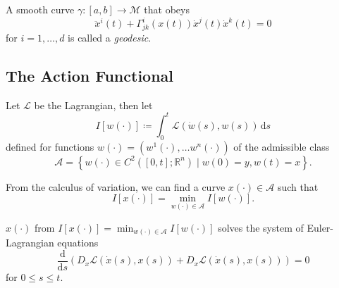 \begin{definition}[Geodesic]\label{def:geodesic}
	A smooth curve \(\gamma \colon [a, b] \to  \mathcal{M} \) that obeys
	\begin{equation}\label{eq:geodesic}
		\ddot{x}^i(t) + \Gamma ^{i}_{jk}(x(t)) \dot{x}^j(t)\dot{x}^k(t) = 0
	\end{equation}
	for \(i = 1, \ldots , d\) is called a \emph{geodesic}.
\end{definition}

\subsection{The Action Functional}

\begin{definition}[Action]
	Let \(\mathcal{L} \) be the Lagrangian, then let
	\[
		I[w(\cdot)] \coloneqq \int_{0}^{t} \mathcal{L} (\dot{w}(s), w(s)) \,\mathrm{d}s
	\]
	defined for functions \(w(\cdot) = (w^1(\cdot), \ldots w^n(\cdot))\) of the admissible class
	\[
		\mathcal{A} =\left\{ w(\cdot)\in C^2([0, t]; \mathbb{R} ^n) \mid w(0)= y, w(t)= x\right\}.
	\]
\end{definition}

From the calculus of variation, we can find a curve \(x(\cdot)\in \mathcal{A} \) such that
\[
	I[x(\cdot)] = \min _{w(\cdot)\in \mathcal{A} }I[w(\cdot)].
\]

\begin{theorem}
	\(x(\cdot)\) from \(I[x(\cdot)] = \min _{w(\cdot)\in \mathcal{A} }I[w(\cdot)]\) solves the system of Euler-Lagrangian equations
	\[
		\frac{\mathrm{d}}{\mathrm{d}s} \left( D_{\dot{x}} \mathcal{L} (\dot{x}(s), x(s)) + D_x \mathcal{L} (\dot{x}(s), x(s)) \right) = 0
	\]
	for \(0 \leq s \leq t\).
\end{theorem}